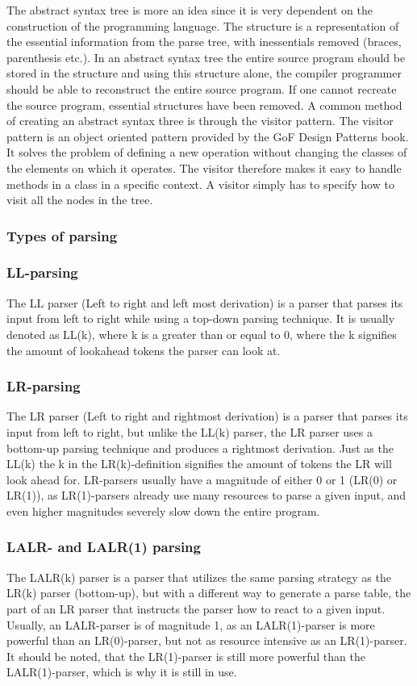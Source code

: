 The abstract syntax tree is more an idea since it is very dependent on the construction of the programming language. The structure is a representation of the essential information from the parse tree, with inessentials removed (braces, parenthesis etc.). In an abstract syntax tree the entire source program should be stored in the structure and using this structure alone, the compiler programmer should be able to reconstruct the entire source program. If one cannot recreate the source program, essential structures have been removed.\cite{crafting-a-compiler}
A common method of creating an abstract syntax three is through the visitor pattern. The visitor pattern is an object oriented pattern provided by the GoF Design Patterns book.
It solves the problem of defining a new operation without changing the classes of the elements on which it operates.
The visitor therefore makes it easy to handle methods in a class in a specific context. A visitor simply has to specify how to visit all the nodes in the tree.
\subsubsection{Types of parsing}
\subsubsection*{LL-parsing}
The LL parser (Left to right and left most derivation) is a parser that parses its input from left to right while using a top-down parsing technique. It is usually denoted as LL(k), where k is a greater than or equal to 0, where the k signifies the amount of lookahead tokens the parser can look at\cite{conceptsOfProgrammingLanguages}.

\subsubsection*{LR-parsing}
The LR parser (Left to right and rightmost derivation) is a parser that parses its input from left to right, but unlike the LL(k) parser, the LR parser uses a bottom-up parsing technique and produces a rightmost derivation. Just as the LL(k) the k in the LR(k)-definition signifies the amount of tokens the LR will look ahead for\cite{conceptsOfProgrammingLanguages}. LR-parsers usually have a magnitude of either 0 or 1 (LR(0) or LR(1)), as LR(1)-parsers already use many resources to parse a given input, and even higher magnitudes severely slow down the entire program.

\subsubsection*{LALR- and LALR(1) parsing}
The LALR(k) parser is a parser that utilizes the same parsing strategy as the LR(k) parser (bottom-up), but with a different way to generate a parse table, the part of an LR parser that instructs the parser how to react to a given input. Usually, an LALR-parser is of magnitude 1, as an LALR(1)-parser is more powerful than an LR(0)-parser, but not as resource intensive as an LR(1)-parser. It should be noted, that the LR(1)-parser is still more powerful than the LALR(1)-parser, which is why it is still in use\cite{crafting-a-compiler}.

